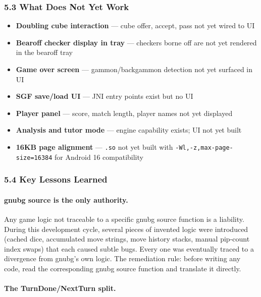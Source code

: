 \documentclass[11pt,a4paper]{article}
\providecommand{\tightlist}{\setlength{\itemsep}{2pt}\setlength{\parskip}{0pt}}
\begin{document}
\subsubsection{5.3 What Does Not Yet Work}\label{what-does-not-work-v085}

\begin{itemize}
\tightlist
\item
  \textbf{Doubling cube interaction} --- cube offer, accept, pass not yet
  wired to UI
\item
  \textbf{Bearoff checker display in tray} --- checkers borne off are
  not yet rendered in the bearoff tray
\item
  \textbf{Game over screen} --- gammon/backgammon detection not yet
  surfaced in UI
\item
  \textbf{SGF save/load UI} --- JNI entry points exist but no UI
\item
  \textbf{Player panel} --- score, match length, player names not yet
  displayed
\item
  \textbf{Analysis and tutor mode} --- engine capability exists; UI
  not yet built
\item
  \textbf{16KB page alignment} --- \texttt{.so} not yet built with
  \texttt{-Wl,-z,max-page-size=16384} for Android 16 compatibility
\end{itemize}

\subsubsection{5.4 Key Lessons Learned}\label{lessons-v085}

\paragraph{gnubg source is the only authority.}

Any game logic not traceable to a specific gnubg source function is a
liability. During this development cycle, several pieces of invented
logic were introduced (cached dice, accumulated move strings, move
history stacks, manual pip-count index swaps) that each caused subtle
bugs. Every one was eventually traced to a divergence from gnubg's own
logic. The remediation rule: before writing any code, read the
corresponding gnubg source function and translate it directly.

\paragraph{The TurnDone/NextTurn split.}
\end{document}
